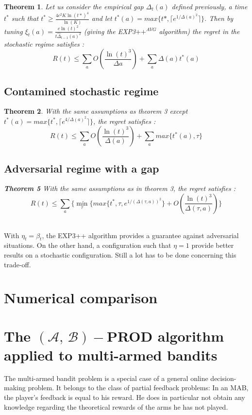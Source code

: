 \documentclass[11pt]{article}
\newtheorem{theorem}{Theorem}
\begin{document}
\begin{theorem}
Let us consider the empirical gap $\Delta_{t}(a)$ defined previously, a time $t^{*}$ such that $t^{*}\geq \frac{4c^{2}K\ln(t*)^{4}}{\ln(K)}$ and let $t^{*}(a)=max\{t*,\lceil e^{1/\Delta(a)^{2}}\rceil\}$.
Then by tuning $\xi_{t}(a)=\frac{c\ln(t)^{2}}{t\hat{\Delta}_{t-1}(a)^{2}}$ (giving the EXP3$++^{AVG}$ algorithm) the regret in the stochastic regime satisfies :
$$R(t) \leq \sum_{a}O(\frac{\ln(t)^{3}}{\Delta{a}})+\sum_{a}\Delta(a)t^{*}(a)$$
\end{theorem}

\subsection*{Contamined stochastic regime}

\begin{theorem}
With the same assumptions as theorem 3 except $t^{*}(a)=max\{t^{*}, \lceil e^{4/\Delta(a)^{2}}\rceil \}$, the regret satisfies :
$$R(t) \leq \sum_{a}O(\frac{\ln(t)^{3}}{\Delta(a)})+\sum_{a}max\{t^{*}(a),\tau\}$$
\subsection*{Adversarial regime with a gap}
\textbf{Theorem 5} With the same assumptions as in theorem 3, the regret satisfies :
$$R(t) \leq \sum_{a}\{\min_{\tau}\{max\{t^{*},\tau,e^{1/(\Delta(\tau,a))^{2}}\}+O(\frac{\ln(t)^{3}}{\Delta(\tau,a)})\}$$~\\
\end{theorem}

With $\eta_{t}=\beta_{t}$, the EXP3++ algorithm provides a guarantee against adversarial situations. On the other hand, a configuration such that $\eta=1$ provide better results on a stochastic configuration. Still a lot has to be done concerning this trade-off.

\section*{Numerical comparison}


\section*{The $(\mathcal{A},\, \mathcal{B})-$PROD algorithm applied to multi-armed bandits}

The multi-armed bandit problem is a special case of a general online decision-making problem. It belongs to the class of partial feedback problems: In an MAB, the player's feedback is equal to his reward. He does in particular not obtain any knowledge regarding the theoretical rewards of the arms he has not played.
\end{document}
